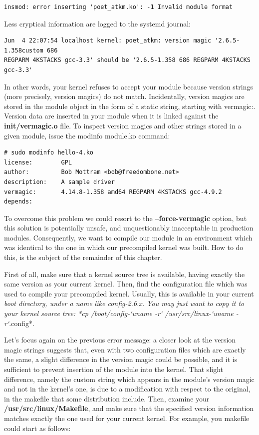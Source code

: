 \documentclass[11pt]{article}
\begin{document}
\begin{verbatim}
insmod: error inserting 'poet_atkm.ko': -1 Invalid module format
\end{verbatim}

Less cryptical information are logged to the systemd journal:

\begin{verbatim}
Jun  4 22:07:54 localhost kernel: poet_atkm: version magic '2.6.5-1.358custom 686
REGPARM 4KSTACKS gcc-3.3' should be '2.6.5-1.358 686 REGPARM 4KSTACKS gcc-3.3'
\end{verbatim}

In other words, your kernel refuses to accept your module because version strings (more precisely, version magics) do not match. Incidentally, version magics are stored in the module object in the form of a static string, starting with vermagic:. Version data are inserted in your module when it is linked against the \textbf{init/vermagic.o} file. To inspect version magics and other strings stored in a given module, issue the modinfo module.ko command:

\begin{verbatim}
# sudo modinfo hello-4.ko
license:        GPL
author:         Bob Mottram <bob@freedombone.net>
description:    A sample driver
vermagic:       4.14.8-1.358 amd64 REGPARM 4KSTACKS gcc-4.9.2
depends:
\end{verbatim}

To overcome this problem we could resort to the \textbf{--force-vermagic} option, but this solution is potentially unsafe, and unquestionably inacceptable in production modules. Consequently, we want to compile our module in an environment which was identical to the one in which our precompiled kernel was built. How to do this, is the subject of the remainder of this chapter.

First of all, make sure that a kernel source tree is available, having exactly the same version as your current kernel. Then, find the configuration file which was used to compile your precompiled kernel. Usually, this is available in your current \emph{boot directory, under a name like config-2.6.x. You may just want to copy it to your kernel source tree: *cp /boot/config-`uname -r` /usr/src/linux-`uname -r`}.config*.

Let's focus again on the previous error message: a closer look at the version magic strings suggests that, even with two configuration files which are exactly the same, a slight difference in the version magic could be possible, and it is sufficient to prevent insertion of the module into the kernel. That slight difference, namely the custom string which appears in the module's version magic and not in the kernel's one, is due to a modification with respect to the original, in the makefile that some distribution include. Then, examine your \textbf{/usr/src/linux/Makefile}, and make sure that the specified version information matches exactly the one used for your current kernel. For example, you makefile could start as follows:
\end{document}
